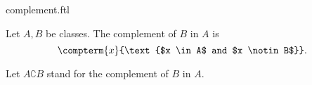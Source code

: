 \documentclass{article}
\begin{document}
\begin{smodule}[creators={Marcel Schütz}]{complement.ftl}


  \begin{fdefinition*}[label=7620345041256448]
    Let $A, B$ be classes.
    The complement of $B$ in $A$ is
    \[\compterm{x}{\text{$x \in A$ and $x \notin B$}}.\]
  \end{fdefinition*}

  \begin{fconvention*}
    Let $A \complement B$ stand for the complement of $B$ in $A$.
  \end{fconvention*}
\end{smodule}
\end{document}
